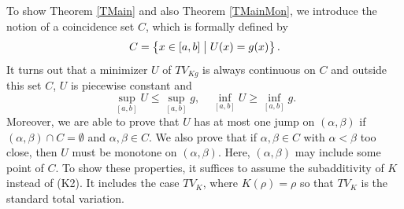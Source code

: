 \documentclass[11pt]{amsart} %
\numberwithin{equation}{section}
\begin{document}
To show Theorem \ref{TMain} and also Theorem \ref{TMainMon}, we introduce the notion of a coincidence set $C$, which is formally defined by
\[
	C = \left\{ x \in [a,b] \bigm|
	U(x) = g(x) \right\}.
\]
It turns out that a minimizer $U$ of $TV_{Kg}$ is always continuous on $C$ and outside this set $C$, $U$ is piecewise constant and
\begin{equation} \label{EB0}
	\sup_{[a,b]}U \leq \sup_{[a,b]}g, \quad
	\inf_{[a,b]}U\geq\inf_{[a,b]}g.
\end{equation}
Moreover, we are able to prove that $U$ has at most one jump on $(\alpha,\beta)$ if $(\alpha,\beta)\cap C=\emptyset$ and $\alpha,\beta\in C$.
 We also prove that if $\alpha,\beta\in C$ with $\alpha<\beta$ too close, then $U$ must be monotone on $(\alpha,\beta)$.
 Here, $(\alpha,\beta)$ may include some point of $C$.
 To show these properties, it suffices to assume the subadditivity of $K$ instead of (K2).
 It includes the case $TV_K$, where $K(\rho)=\rho$ so that $TV_K$ is the standard total variation.
\end{document}

